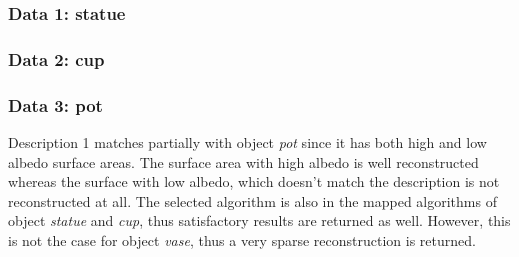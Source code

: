 
\subsubsection{Data 1: statue}

\subsubsection{Data 2: cup}

\subsubsection{Data 3: pot}
Description 1 matches partially with object \textit{pot} since it has both high and low albedo surface areas. The surface area with high albedo is well reconstructed whereas the surface with low albedo, which doesn't match the description is not reconstructed at all. The selected algorithm is also in the mapped algorithms of object \textit{statue} and \textit{cup}, thus satisfactory results are returned as well. However, this is not the case for object \textit{vase}, thus a very sparse reconstruction is returned.

